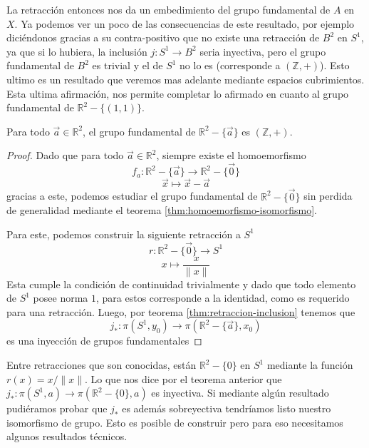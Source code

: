 La retracción entonces nos da un embedimiento del grupo fundamental de
\( A \) en \(X\). Ya podemos ver un poco de las consecuencias de este
resultado, por ejemplo diciéndonos gracias a su contra-positivo que no
existe una retracción de \(B^2\) en \(S^1\), ya que si lo hubiera, la
inclusión \(j : S^1 \to B^2\) seria inyectiva, pero el grupo fundamental
de \(B^2\) es trivial y el de \(S^1\) no lo es (corresponde a \((\mathbb
Z, +)\)). Esto ultimo es un resultado que veremos mas adelante
mediante espacios cubrimientos. Esta ultima afirmación, nos permite
completar lo afirmado en cuanto al grupo fundamental de \(\mathbb R ^2 -
\{(1,1)\}\).

\begin{corolario}
  Para todo \(\vec a \in \mathbb R ^2\), el grupo fundamental de \(\mathbb R ^2 - \{\vec a\}\) es \((\mathbb Z, +)\).
\end{corolario}
\begin{proof}
Dado que para todo \(\vec a \in \mathbb R ^2 \), siempre existe
el homoemorfismo
\[ f_a : \mathbb R ^2 - \{\vec a\} \to \mathbb R ^2 - \{\vec 0\} \]
\[ \vec x \mapsto \vec x - \vec a \]
gracias a este, podemos estudiar el grupo fundamental de \(\mathbb R ^2
- \{\vec 0\}\) sin perdida de generalidad mediante el teorema
\ref{thm:homoemorfismo-isomorfismo}.

Para este, podemos construir la siguiente retracción a \(S^1\)
\[ r : \mathbb R ^2 - \{\vec 0\} \to S^1 \]
\[ x \mapsto \frac x {\lVert x \rVert} \]
Esta cumple la condición de continuidad trivialmente y dado que todo
elemento de \(S^1\) posee norma \(1\), para estos corresponde a la
identidad, como es requerido para una retracción. Luego, por teorema
\ref{thm:retraccion-inclusion} tenemos que
\[ j_* : \pi (S^1 , y_0) \to \pi (\mathbb R ^2 - \{\vec a\}, x_0) \]
es una inyección de grupos fundamentales

\end{proof}

Entre retracciones que son conocidas, están \(\mathbb R ^2 - \{0\}\) en
\(S^1\) mediante la función \(r (x) = x / \lVert x \rVert \). Lo que nos
dice por el teorema anterior que \(j_{*} : \pi (S^1, a) \to \pi (\mathbb
R ^2 - \{0\}, a)\) es inyectiva. Si mediante algún resultado pudiéramos
probar que \(j_{*}\) es además sobreyectiva tendríamos listo nuestro
isomorfismo de grupo. Esto es posible de construir pero para eso
necesitamos algunos resultados técnicos.

